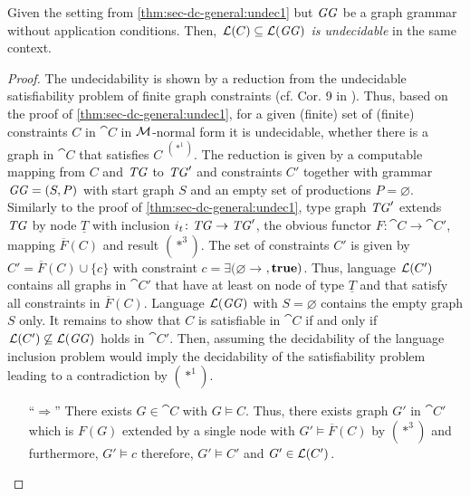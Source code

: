 \begin{theorem}
\label{thm:sec-dc-general:undec2}
Given the setting from \cref{thm:sec-dc-general:undec1} but $\mathit{GG}$ be a graph grammar without application conditions.
Then, \emph{$\mathcal{L}(C) \subseteq \mathcal{L}(\mathit{GG})$ is undecidable} in the same context.
\end{theorem}

\begin{proof}
The undecidability is shown by a reduction from the undecidable satisfiability problem of finite graph constraints (cf. Cor. 9 in \cite{DBLP:journals/mscs/HabelP09}).
Thus, based on the proof of \cref{thm:sec-dc-general:undec1}, for a given (finite) set of (finite) constraints $C$ in $\cat{C}$ in ${\cal M}$-normal form it is undecidable, whether there is a graph in $\cat{C}$ that satisfies $C$ $^{(*^1)}$.
The reduction is given by a computable mapping from $C$ and $\mathit{TG}$ to $\mathit{TG}'$ and constraints $C'$ together with grammar $\mathit{GG}=(S,P)$ with start graph $S$ and an empty set of productions $P=\varnothing$.
Similarly to the proof of \cref{thm:sec-dc-general:undec1}, type graph $\mathit{TG}'$ extends $\mathit{TG}$ by node $\underline{T}$ with inclusion $i_t\colon \mathit{TG} \to \mathit{TG}'$, the obvious functor $F\colon \cat{C} \to \cat{C'}$, mapping $\overline{F}(C)$ and result $(*^3)$.
The set of constraints $C'$ is given by $C'=\overline{F}(C) \cup \{c\}$ with constraint $c=\exists(\varnothing \to $$,\textbf{true})$.
Thus, language $\mathcal{L}(C')$ contains all graphs in $\cat{C'}$ that have at least on node of type $\underline{T}$ and that satisfy all constraints in $\overline{F}(C)$.
Language $\mathcal{L}(\mathit{GG})$ with $S=\varnothing$ contains the empty graph $S$ only.
It remains to show that $C$ is satisfiable in $\cat{C}$ if and only if $\mathcal{L}(C') \not\subseteq \mathcal{L}(\mathit{GG})$ holds in $\cat{C'}$.
Then, assuming the decidability of the language inclusion problem would imply the decidability of the satisfiability problem leading to a contradiction by $(*^1)$.
\begin{itemize}
  \item[``$\Rightarrow$''] There exists $G \in \cat{C}$ with $G \models C$.
  Thus, there exists graph $G'$ in $\cat{C'}$ which is $F(G)$ extended by a single node  with $G' \models \overline{F}(C)$ by $(*^3)$ and furthermore, $G' \models c$ therefore, $G' \models C'$ and $G' \in \mathcal{L}(C')$.

\end{itemize}
\end{proof}
